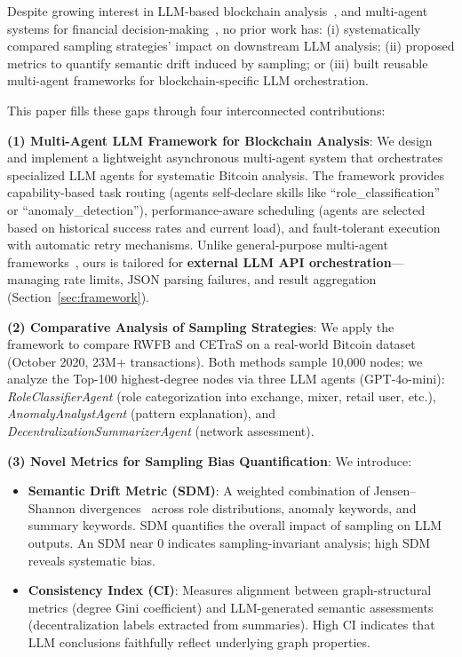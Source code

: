 Despite growing interest in LLM-based blockchain analysis~\cite{lei2025llm,chen2024llm,wang2024crypto}, and multi-agent systems for financial decision-making~\cite{li2024multiagent,qian2023communicative}, no prior work has: (i) systematically compared sampling strategies' impact on downstream LLM analysis; (ii) proposed metrics to quantify semantic drift induced by sampling; or (iii) built reusable multi-agent frameworks for blockchain-specific LLM orchestration.

This paper fills these gaps through four interconnected contributions:

\textbf{(1) Multi-Agent LLM Framework for Blockchain Analysis}: We design and implement a lightweight asynchronous multi-agent system that orchestrates specialized LLM agents for systematic Bitcoin analysis. The framework provides capability-based task routing (agents self-declare skills like ``role\_classification'' or ``anomaly\_detection''), performance-aware scheduling (agents are selected based on historical success rates and current load), and fault-tolerant execution with automatic retry mechanisms. Unlike general-purpose multi-agent frameworks~\cite{qian2023communicative,wang2023scientific}, ours is tailored for \textbf{external LLM API orchestration}---managing rate limits, JSON parsing failures, and result aggregation (Section~\ref{sec:framework}).

\textbf{(2) Comparative Analysis of Sampling Strategies}: We apply the framework to compare RWFB and CETraS on a real-world Bitcoin dataset (October 2020, 23M+ transactions). Both methods sample 10,000 nodes; we analyze the Top-100 highest-degree nodes via three LLM agents (GPT-4o-mini): \textit{RoleClassifierAgent} (role categorization into exchange, mixer, retail user, etc.), \textit{AnomalyAnalystAgent} (pattern explanation), and \textit{DecentralizationSummarizerAgent} (network assessment).

\textbf{(3) Novel Metrics for Sampling Bias Quantification}: We introduce:
\begin{itemize}
    \item \textbf{Semantic Drift Metric (SDM)}: A weighted combination of Jensen--Shannon divergences~\cite{lin1991jsd} across role distributions, anomaly keywords, and summary keywords. SDM quantifies the overall impact of sampling on LLM outputs. An SDM near 0 indicates sampling-invariant analysis; high SDM reveals systematic bias.
    \item \textbf{Consistency Index (CI)}: Measures alignment between graph-structural metrics (degree Gini coefficient) and LLM-generated semantic assessments (decentralization labels extracted from summaries). High CI indicates that LLM conclusions faithfully reflect underlying graph properties.
\end{itemize}

